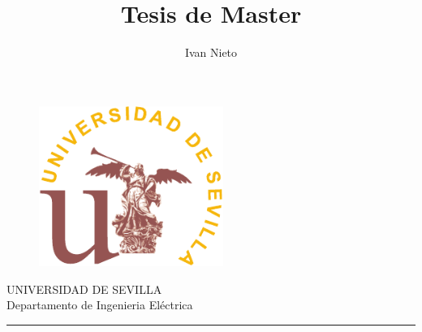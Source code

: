 \documentclass[11pt,a4paper,twoside,titlepage]{book}
\author{Ivan Nieto}
\title{Tesis de Master}
\begin{document}
 


\begin{titlepage}
		\vspace*{-2.5cm}
	\begin{figure}
		\centering
	 	 \includegraphics[width=6cm]{eps_us}\\
	\end{figure}
	\begin{center}
		\vspace*{1.5cm} {\large UNIVERSIDAD DE SEVILLA} \\[0.3cm] {\large
		Departamento de Ingenieria Eléctrica}
		\vspace*{0.5cm}
	
		\noindent \rule{\textwidth}{0.5pt}%
		\vspace*{0.5cm}
		{\Large \scshape
	
	
}
\end{center}
\end{titlepage}
\end{document}

